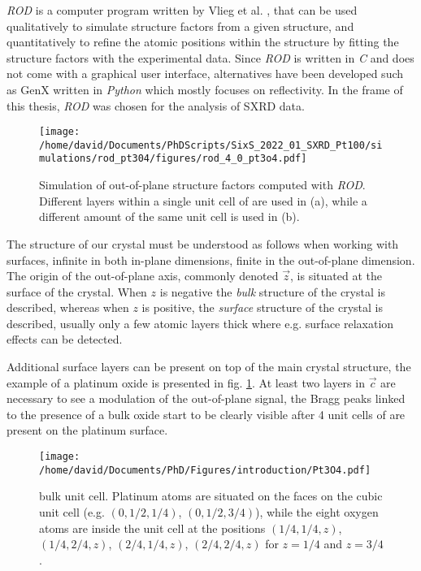 \textit{ROD} is a computer program written by Vlieg et al. \parencite*{Vlieg2000}, that can be used qualitatively to simulate structure factors from a given structure, and quantitatively to refine the atomic positions within the structure by fitting the structure factors with the experimental data.
Since \textit{ROD} is written in \textit{C} and does not come with a graphical user interface, alternatives have been developed such as GenX \parencite{Bjorck2007, Glavic2022} written in \textit{Python} which mostly focuses on reflectivity.
In the frame of this thesis, \textit{ROD} was chosen for the analysis of SXRD data.

\begin{figure}[!htb]
    \texttt{[image: /home/david/Documents/PhDScripts/SixS\_2022\_01\_SXRD\_Pt100/simulations/rod\_pt304/figures/rod\_4\_0\_pt3o4.pdf]}
    \caption{
        Simulation of out-of-plane structure factors computed with \textit{ROD}.
        Different layers within a single unit cell of  are used in (a), while a different amount of the same  unit cell is used in (b).
    }
    \label{fig:SimROD}
\end{figure}

The structure of our crystal must be understood as follows when working with surfaces, infinite in both in-plane dimensions, finite in the out-of-plane dimension.
The origin of the out-of-plane axis, commonly denoted $\vec{z}$, is situated at the surface of the crystal.
When $z$ is negative the \textit{bulk} structure of the crystal is described, whereas when $z$ is positive, the \textit{surface} structure of the crystal is described, usually only a few atomic layers thick where e.g. surface relaxation effects can be detected.

Additional surface layers can be present on top of the main crystal structure, the example of a  platinum oxide is presented in fig. \ref{fig:SimROD}.
At least two layers in $\vec{c}$ are necessary to see a modulation of the out-of-plane signal, the Bragg peaks linked to the presence of a bulk oxide start to be clearly visible after 4 unit cells of  are present on the platinum surface.

\begin{SCfigure}
    \centering
    \texttt{[image: /home/david/Documents/PhD/Figures/introduction/Pt3O4.pdf]}
    \caption{
         bulk unit cell.
        Platinum atoms are situated on the faces on the cubic unit cell (e.g. $(0, 1/2, 1/4)$, $(0, 1/2, 3/4)$), while the eight oxygen atoms are inside the unit cell at the positions $(1/4, 1/4, z)$, $(1/4, 2/4, z)$, $(2/4, 1/4, z)$, $(2/4, 2/4, z)$ for $z=1/4$ and $z=3/4$.
    }
    \label{fig:Pt3O4_ROD}
\end{SCfigure}

